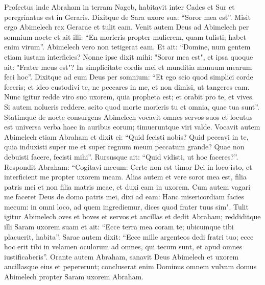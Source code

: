 \begin{biblechapter}  
\verse Profectus inde Abraham in terram Nageb, habitavit inter Cades et Sur et peregrinatus est in Geraris. 
\verse Dixitque de Sara uxore sua: “Soror mea est”. Misit ergo Abimelech rex Gerarae et tulit eam. 
\verse Venit autem Deus ad Abimelech per somnium nocte et ait illi: “En morieris propter mulierem, quam tulisti; habet enim virum”. 
\verse Abimelech vero non tetigerat eam. Et ait: “Domine, num gentem etiam iustam interficies? 
\verse Nonne ipse dixit mihi: "Soror mea est", et ipsa quoque ait: "Frater meus est"? In simplicitate cordis mei et munditia manuum mearum feci hoc”. 
\verse Dixitque ad eum Deus per somnium: “Et ego scio quod simplici corde feceris; et ideo custodivi te, ne peccares in me, et non dimisi, ut tangeres eam. 
\verse Nunc igitur redde viro suo uxorem, quia propheta est; et orabit pro te, et vives. Si autem nolueris reddere, scito quod morte morieris tu et omnia, quae tua sunt”. 
\verse Statimque de nocte consurgens Abimelech vocavit omnes servos suos et locutus est universa verba haec in auribus eorum; timueruntque viri valde. 
\verse Vocavit autem Abimelech etiam Abraham et dixit ei: “Quid fecisti nobis? Quid peccavi in te, quia induxisti super me et super regnum meum peccatum grande? Quae non debuisti facere, fecisti mihi”. 
\verse Rursusque ait: “Quid vidisti, ut hoc faceres?”. 
\verse Respondit Abraham: “Cogitavi mecum: Certe non est timor Dei in loco isto, et interficient me propter uxorem meam. 
\verse Alias autem et vere soror mea est, filia patris mei et non filia matris meae, et duxi eam in uxorem. 
\verse Cum autem vagari me faceret Deus de domo patris mei, dixi ad eam: Hanc misericordiam facies mecum: in omni loco, ad quem ingrediemur, dices quod frater tuus sim". 
\verse Tulit igitur Abimelech oves et boves et servos et ancillas et dedit Abraham; reddiditque illi Saram uxorem suam 
\verse et ait: “Ecce terra mea coram te; ubicumque tibi placuerit, habita”. 
\verse Sarae autem dixit: “Ecce mille argenteos dedi fratri tuo; ecce hoc erit tibi in velamen oculorum ad omnes, qui tecum sunt, et apud omnes iustificaberis”. 
\verse Orante autem Abraham, sanavit Deus Abimelech et uxorem ancillasque eius et pepererunt; 
\verse concluserat enim Dominus omnem vulvam domus Abimelech propter Saram uxorem Abraham. 
\end{biblechapter}

